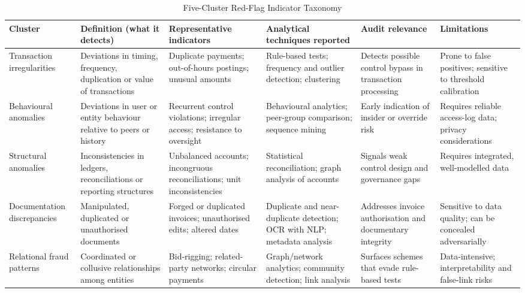 \documentclass[conference]{IEEEtran}
\begin{document}
\begin{table}[!t]
\caption{Five-Cluster Red-Flag Indicator Taxonomy}
\label{tab:taxonomy}
\centering
\scriptsize
\setlength{\tabcolsep}{4pt}
\begin{tabular}{p{} p{} p{} p{} p{} p{}}
\toprule
\textbf{Cluster} & \textbf{Definition (what it detects)} & \textbf{Representative indicators} & \textbf{Analytical techniques reported} & \textbf{Audit relevance} & \textbf{Limitations} \\
\midrule
Transaction irregularities & Deviations in timing, frequency, duplication or value of transactions & Duplicate payments; out-of-hours postings; unusual amounts & Rule-based tests; frequency and outlier detection; clustering & Detects possible control bypass in transaction processing & Prone to false positives; sensitive to threshold calibration \\
Behavioural anomalies & Deviations in user or entity behaviour relative to peers or history & Recurrent control violations; irregular access; resistance to oversight & Behavioural analytics; peer-group comparison; sequence mining & Early indication of insider or override risk & Requires reliable access-log data; privacy considerations \\
Structural anomalies & Inconsistencies in ledgers, reconciliations or reporting structures & Unbalanced accounts; incongruous reconciliations; unit inconsistencies & Statistical reconciliation; graph analysis of accounts & Signals weak control design and governance gaps & Requires integrated, well-modelled data \\
Documentation discrepancies & Manipulated, duplicated or unauthorised documents & Forged or duplicated invoices; unauthorised edits; altered dates & Duplicate and near-duplicate detection; OCR with NLP; metadata analysis & Addresses invoice authorisation and documentary integrity & Sensitive to data quality; can be concealed adversarially \\
Relational fraud patterns & Coordinated or collusive relationships among entities & Bid-rigging; related-party networks; circular payments & Graph/network analytics; community detection; link analysis & Surfaces schemes that evade rule-based tests & Data-intensive; interpretability and false-link risks \\
\bottomrule
\end{tabular}
\end{table}
\end{document}
